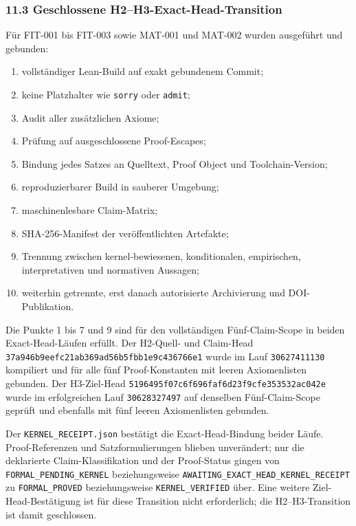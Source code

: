 \documentclass[
  10pt,
  a4paper,
]{article}
\providecommand{\tightlist}{%
  \setlength{\itemsep}{0pt}\setlength{\parskip}{0pt}}
\begin{document}
\hypertarget{geschlossene-h2-h3-exact-head-transition}{%
\subsubsection{11.3 Geschlossene H2--H3-Exact-Head-Transition}%
\label{geschlossene-h2-h3-exact-head-transition}}

Für FIT-001 bis FIT-003 sowie MAT-001 und MAT-002 wurden ausgeführt und
gebunden:

\begin{enumerate}
\def\labelenumi{\arabic{enumi}.}
\tightlist
\item
  vollständiger Lean-Build auf exakt gebundenem Commit;
\item
  keine Platzhalter wie \texttt{sorry} oder \texttt{admit};
\item
  Audit aller zusätzlichen Axiome;
\item
  Prüfung auf ausgeschlossene Proof-Escapes;
\item
  Bindung jedes Satzes an Quelltext, Proof Object und Toolchain-Version;
\item
  reproduzierbarer Build in sauberer Umgebung;
\item
  maschinenlesbare Claim-Matrix;
\item
  SHA-256-Manifest der veröffentlichten Artefakte;
\item
  Trennung zwischen kernel-bewiesenen, konditionalen, empirischen,
  interpretativen und normativen Aussagen;
\item
  weiterhin getrennte, erst danach autorisierte Archivierung und
  DOI-Publikation.
\end{enumerate}

Die Punkte 1 bis 7 und 9 sind für den vollständigen Fünf-Claim-Scope in
beiden Exact-Head-Läufen erfüllt. Der H2-Quell- und Claim-Head
\texttt{37a946b9eefc21ab369ad56b5fbb1e9c436766e1} wurde im Lauf
\texttt{30627411130} kompiliert und für alle fünf Proof-Konstanten mit
leeren Axiomenlisten gebunden. Der H3-Ziel-Head
\texttt{5196495f07c6f696faf6d23f9cfe353532ac042e} wurde im erfolgreichen
Lauf \texttt{30628327497} auf denselben Fünf-Claim-Scope geprüft und
ebenfalls mit fünf leeren Axiomenlisten gebunden.

Der \texttt{KERNEL\_RECEIPT.json} bestätigt die Exact-Head-Bindung beider
Läufe. Proof-Referenzen und Satzformulierungen blieben unverändert; nur
die deklarierte Claim-Klassifikation und der Proof-Status gingen von
\texttt{FORMAL\_PENDING\_KERNEL} beziehungsweise
\texttt{AWAITING\_EXACT\_HEAD\_KERNEL\_RECEIPT} zu
\texttt{FORMAL\_PROVED} beziehungsweise \texttt{KERNEL\_VERIFIED} über.
Eine weitere Ziel-Head-Bestätigung ist für diese Transition nicht
erforderlich; die H2--H3-Transition ist damit geschlossen.
\end{document}
